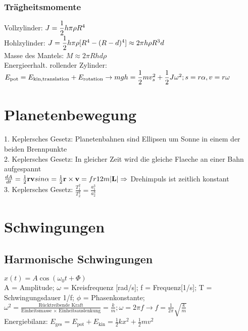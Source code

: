 \documentclass[fs, footer]{latex4ei}
\begin{document}
\begin{multicols*}{4}
\subsubsection{Trägheitsmomente}
Vollzylinder: $J = \dfrac{1}{2}h\pi \rho R^4$\\
Hohlzylinder: $J = \dfrac{1}{2}h\pi \rho[R^4-(R-d)^4] \approx 2 \pi h\rho R^3d$\\
Masse des Mantels: $M \approx 2 \pi R h d \rho$\\
Energieerhalt. rollender Zylinder: $E_{\text{pot}} = E_{\text{kin,translation}} + E_{\text{rotation}} \rightarrow mgh = \dfrac{1}{2}mv_s^2 + \dfrac{1}{2}J\omega ^2; s = r\alpha, v = r\omega$\\

\section{Planetenbewegung}
1. Keplersches Gesetz: Planetenbahnen sind Ellipsen um Sonne in einem der beiden Brennpunkte\\
2. Keplersches Gesetz: In gleicher Zeit wird die gleiche Flaeche an einer Bahn aufgespannt\\$\frac{dA}{dt} = \frac{1}{2} \textbf{r} \textbf{v} sin \alpha = \frac{1}{2}\textbf{r} \times \textbf{v} = fr{1}{2m}|\textbf{L}| \Rightarrow$ Drehimpuls ist zeitlich konstant\\
3. Keplersches Gesetz: $\frac{T_1^2}{T_2^2} = \frac{a_1^3}{a_2^3}$\\

\section{Schwingungen}
\subsection{Harmonische Schwingungen} $x(t) = A \cos(\omega_0t + \Phi)$\\
A = Amplitude; $\omega$ = Kreisfrequenz [rad/s]; f = Frequenz[1/s]; T = Schwingungsdauer 1/f; $\phi$ = Phasenkonstante;\\
$\omega ^2 = \frac{\text{Rücktreibende Kraft}}{\text{Einheitsmasse $\times$ Einheitsauslenkung}} = \frac{k}{m};	\omega = 2 \pi f \rightarrow f = \frac{1}{2\pi}\sqrt{\frac{k}{m}}$\\
Energiebilanz: $E_{\text{ges}} = E_{\text{pot}} + E_{\text{kin}} = \frac{1}{2}kx^2+\frac{1}{2}mv^2$\\

\end{multicols*}
\end{document}
